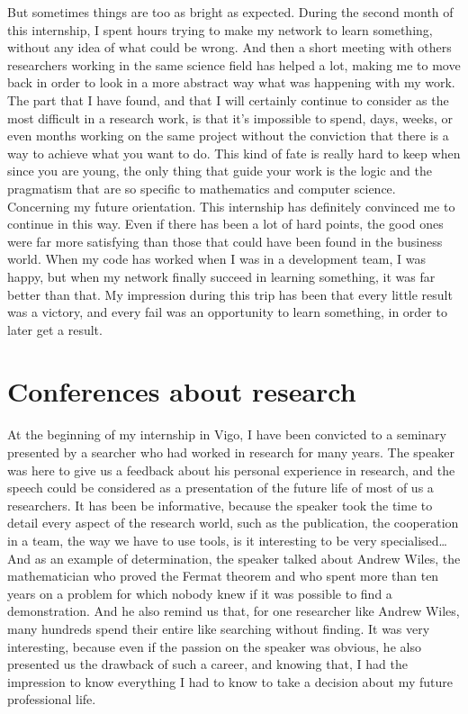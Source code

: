 \documentclass{report}
\begin{document}
		But sometimes things are too as bright as expected. During the second month of this internship, I spent hours trying to make my network to learn something, without any idea of what could be wrong. And then a short meeting with others researchers working in the same science field has helped a lot, making me to move back in order to look in a more abstract way what was happening with my work. The part that I have found, and that I will certainly continue to consider as the most difficult in a research work, is that it's impossible to spend, days, weeks, or even months working on the same project without the conviction that there is a way to achieve what you want to do. This kind of fate is really hard to keep when since you are young, the only thing that guide your work is the logic and the pragmatism that are so specific to mathematics and computer science.\\
		
		Concerning my future orientation. This internship has definitely convinced me to continue in this way. Even if there has been a lot of hard points, the good ones were far more satisfying than those that could have been found in the business world. When my code has worked when I was in a development team, I was happy, but when my network finally succeed in learning something, it was far better than that. My impression during this trip has been that every little result was a victory, and every fail was an opportunity to learn something, in order to later get a result.
		
		\section{Conferences about research}
		
		At the beginning of my internship in Vigo, I have been convicted to a seminary presented by a searcher who had worked in research for many years. The speaker was here to give us a feedback about his personal experience in research, and the speech could be considered as a presentation of the future life of most of us a researchers. It has been be informative, because the speaker took the time to detail every aspect of the research world, such as the publication, the cooperation in a team, the way we have to use tools, is it interesting to be very specialised… And as an example of determination, the speaker talked about Andrew Wiles, the mathematician who proved the Fermat theorem and who spent more than ten years on a problem for which nobody knew if it was possible to find a demonstration. And he also remind us that, for one researcher like Andrew Wiles, many hundreds spend their entire like searching without finding. It was very interesting, because even if the passion on the speaker was obvious, he also presented us the drawback of such a career, and knowing that, I had the impression to know everything I had to know to take a decision about my future professional life.\\
		
\end{document}
